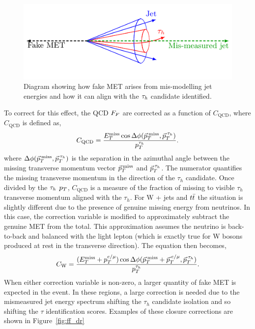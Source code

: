 \begin{figure}[!hbtp]
\centering
   \includegraphics[width=\textwidth]{Figures/fakemet_plot.pdf}
\caption[Diagram of the fake MET alignment with the $\tauh$ candidate.]{Diagram showing how fake MET arises from mis-modelling jet energies and how it can align with the $\tauh$ candidate identified.}
\label{fig:fakemet}
\end{figure}

To correct for this effect, the QCD $F_{F}$ are corrected as a function of $C_{\text{QCD}}$, where $C_{\text{QCD}}$ is defined as,
\begin{equation}
C_{\text{QCD}} = \frac{E_{T}^{\text{miss}} \cos\Delta\phi(\vec{p}_{T}^{\text{\hspace{2pt}miss}},\vec{p}_{T}^{\hspace{2pt}\tau_{h}})}{p_{T}^{\tau_{h}}}.
\label{eqn:c_qcd}
\end{equation}
where $\Delta\phi(\vec{p}_{T}^{\hspace{2pt}\text{miss}},\vec{p}_{T}^{\hspace{2pt}\tau_{h}})$ is the separation in the azimuthal angle between the missing transverse momentum vector $\vec{p}_{T}^{\hspace{2pt}\text{miss}}$ and $\vec{p}_{T}^{\hspace{2pt}\tau_{h}}$.
The numerator quantifies the missing transverse momentum in the direction of the $\tau_h$ candidate. 
Once divided by the $\tauh$ $p_{T}$, $C_{\text{QCD}}$ is a measure of the fraction of missing to visible $\tau_h$ transverse momentum aligned with the $\tau_h$.
For W + jets and $t\bar{t}$ the situation is slightly different due to the presence of genuine missing energy from neutrinos.
In this case, the correction variable is modified to approximately subtract the genuine \ac{MET} from the total.
This approximation assumes the neutrino is back-to-back and balanced with the light lepton (which is exactly true for W bosons produced at rest in the transverse direction). 
The equation then becomes,
\begin{equation}
C_{\text{W}} = \frac{(E_{T}^{\text{miss}}+p_{T}^{e/\mu}) \cos\Delta\phi(\vec{p}_{T}^{\text{\hspace{2pt}miss}}+\vec{p}_{T}^{\hspace{2pt}e/\mu},\vec{p}_{T}^{\hspace{2pt}\tau_{h}})}{p_{T}^{\tau_{h}}}.
\label{eqn:c_w}
\end{equation}
When either correction variable is non-zero, a larger quantity of fake \ac{MET} is expected in the event. 
In these regions, a large correction is needed due to the mismeasured jet energy spectrum shifting the $\tau_h$ candidate isolation and so shifting the $\tau$ identification scores. 
Examples of these closure corrections are shown in Figure~\ref{fig:ff_dr}\\

